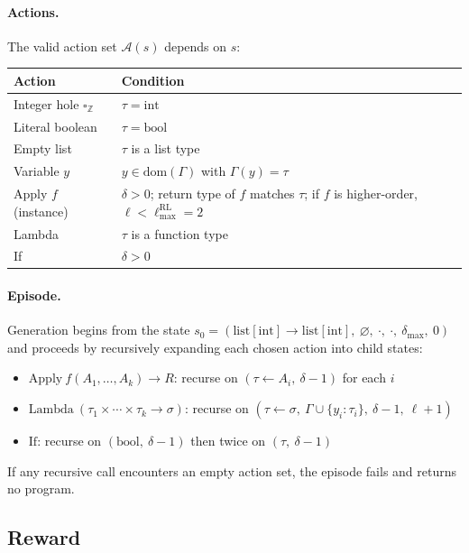 \documentclass[11pt,a4paper]{article}
\begin{document}
\paragraph{Actions.}
The valid action set $\mathcal{A}(s)$ depends on $s$:

\begin{center}
\begin{tabular}{ll}
\toprule
Action & Condition \\
\midrule
Integer hole $\square_{\mathbb{Z}}$ & $\tau = \mathrm{int}$ \\
Literal boolean      & $\tau = \mathrm{bool}$ \\
Empty list           & $\tau$ is a list type \\
Variable $y$         & $y \in \mathrm{dom}(\Gamma)$ with $\Gamma(y) = \tau$ \\
Apply $f$ (instance) & $\delta > 0$; return type of $f$ matches $\tau$;
                       if $f$ is higher-order, $\ell < \ell_{\max}^{\mathrm{RL}} = 2$ \\
Lambda               & $\tau$ is a function type \\
If                   & $\delta > 0$ \\
\bottomrule
\end{tabular}
\end{center}

\paragraph{Episode.}
Generation begins from the state
$s_0 = (\mathrm{list}[\mathrm{int}] \to \mathrm{list}[\mathrm{int}],\
\varnothing,\ \cdot,\ \cdot,\ \delta_{\max},\ 0)$
and proceeds by recursively expanding each chosen action into child states:
\begin{itemize}
  \item $\mathrm{Apply}\ f(A_1, \ldots, A_k) \to R$: recurse on
        $(\tau \leftarrow A_i,\ \delta - 1)$ for each $i$
  \item $\mathrm{Lambda}\ (\tau_1 \times \cdots \times \tau_k \to \sigma)$: recurse on
        $(\tau \leftarrow \sigma,\ \Gamma \cup \{y_i : \tau_i\},\ \delta - 1,\ \ell + 1)$
  \item $\mathrm{If}$: recurse on $(\mathrm{bool},\ \delta-1)$ then twice on
        $(\tau,\ \delta-1)$
\end{itemize}
If any recursive call encounters an empty action set, the episode fails and returns no
program.

\subsection{Reward}\label{sec:reward}
\end{document}
